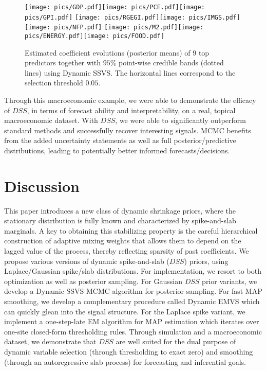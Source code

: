 \documentclass[ba]{imsart}
\numberwithin{equation}{section}
\theoremstyle{plain}
\begin{document}
{\begin{figure}
\texttt{[image: pics/GDP.pdf]}\texttt{[image: pics/PCE.pdf]}\texttt{[image: pics/GPI.pdf]}
\texttt{[image: pics/RGEGI.pdf]}\texttt{[image: pics/IMGS.pdf]}\texttt{[image: pics/NFP.pdf]}
\texttt{[image: pics/M2.pdf]}\texttt{[image: pics/ENERGY.pdf]}\texttt{[image: pics/FOOD.pdf]}
\caption{Estimated coefficient evolutions (posterior means) of $9$ top predictors together with $95\%$ point-wise credible bands (dotted lines) using Dynamic SSVS. The horizontal lines correspond to the selection threshold $0.05$. }\label{fig:evolutions}
\end{figure}



Through this macroeconomic example, we were able to demonstrate the efficacy of $DSS$, in terms of forecast ability and interpretability, on a real, topical macroeconomic dataset.
With $DSS$, we were able to significantly outperform standard methods and successfully recover interesting signals.
MCMC benefits from the  added uncertainty statements as well as  full posterior/predictive distributions, leading to potentially better informed forecasts/decisions.






 
 \section{Discussion}\label{sec:dis}
 This paper introduces a new class of dynamic shrinkage priors, where  the stationary distribution is fully known and characterized by spike-and-slab marginals.  A key to obtaining this stabilizing property is the careful hierarchical construction of adaptive mixing weights that allows them  to depend on the lagged value of the process, thereby reflecting sparsity of past coefficients. 
 We propose  various versions of dynamic spike-and-slab ($DSS$) priors, using Laplace/Gaussian spike/slab distributions. For implementation, we resort to both optimization as well as posterior sampling.
 For Gaussian $DSS$ prior variants, we develop a Dynamic SSVS MCMC algorithm for posterior sampling.  For fast MAP smoothing, we develop a complementary procedure called Dynamic EMVS which can quickly  glean into the signal structure. For the Laplace spike variant,
  we implement a one-step-late EM algorithm for MAP estimation which iterates over one-site closed-form thresholding rules. Through simulation and a macroeconomic dataset, we demonstrate that $DSS$ are well suited for the dual purpose of dynamic variable selection (through thresholding to exact zero) and smoothing (through an autoregressive slab process) for forecasting and inferential goals. 
 
}
\end{document}
